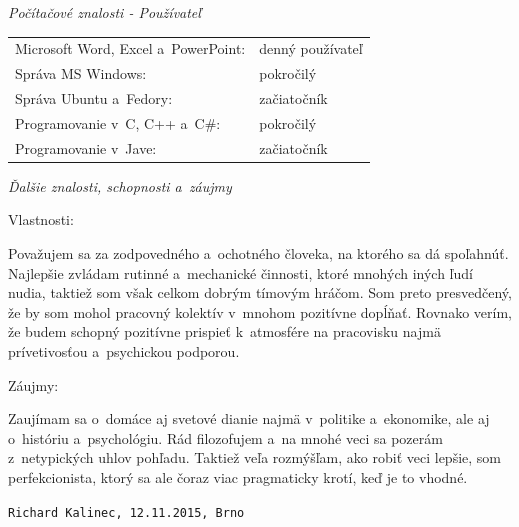 \documentclass{article}
\begin{document}
\bigskip

\begin{flushleft}
\Large
\textit{\textsf{Počítačové znalosti - Používateľ}}
\normalsize
\end{flushleft}

\smallskip

\begin{adjustwidth}{-6pt}{}
	\begin{tabular}{l l}
		Microsoft Word, Excel a~PowerPoint: & denný používateľ \\
		Správa MS Windows: & pokročilý \\
		Správa Ubuntu a~Fedory: & začiatočník \\
		Programovanie v~C, C++ a~C\#: & pokročilý \\
		Programovanie v~Jave: & začiatočník
	\end{tabular}
\end{adjustwidth}

\bigskip

\begin{flushleft}
\Large
\textit{\textsf{Ďalšie znalosti, schopnosti a~záujmy}}
\normalsize
\end{flushleft}

\smallskip

\begin{flushleft}
\large
Vlastnosti:
\end{flushleft}

Považujem sa za zodpovedného a~ochotného človeka, na ktorého sa dá spoľahnúť. Najlepšie zvládam rutinné a~mechanické činnosti, ktoré mnohých iných ľudí nudia, taktiež som však celkom dobrým tímovým hráčom. Som preto presvedčený, že by som mohol pracovný kolektív v~mnohom pozitívne dopĺňať. Rovnako verím, že budem schopný pozitívne prispieť k~atmosfére na pracovisku najmä prívetivosťou a~psychickou podporou.

\smallskip

\begin{flushleft}
\large
Záujmy:
\end{flushleft}

Zaujímam sa o~domáce aj svetové dianie najmä v~politike a~ekonomike,
ale aj o~históriu a~psychológiu. Rád filozofujem a~na mnohé veci sa
pozerám z~netypických uhlov pohľadu. Taktiež veľa rozmýšľam, ako robiť veci lepšie, som perfekcionista, ktorý sa ale čoraz viac pragmaticky krotí, keď je to vhodné.

\bigskip

\texttt{Richard Kalinec, 12.11.2015, Brno}
\end{document}

